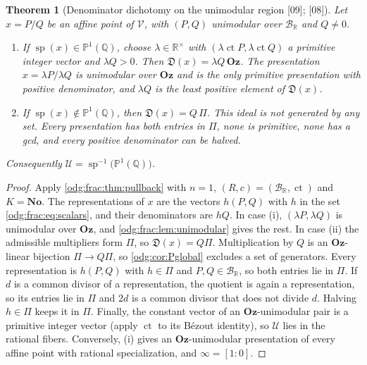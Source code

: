 \documentclass[11pt,oneside]{article}
\numberwithin{equation}{section}
\newtheorem{theorem}{Theorem}[section]
\theoremstyle{definition}
\theoremstyle{remark}
\newcommand{\No}{\mathbf{No}}
\newcommand{\Oz}{\mathbf{Oz}}
\newcommand{\Q}{\mathbb Q}
\newcommand{\R}{\mathbb R}
\newcommand{\BR}{\mathcal B_{\R}}
\newcommand{\ct}{\operatorname{ct}}
\newcommand{\src}[1]{\textup{\textsf{\small[#1]}}}
\newcommand{\Den}{\mathfrak D}
\newcommand{\spz}{\operatorname{sp}}
\newcommand{\Vreg}{\mathcal V}
\newcommand{\Ureg}{\mathcal U}
\begin{document}
\begin{theorem}[Denominator dichotomy on the unimodular region \src{09}; \src{08}]\label{odg:frac:thm:dichotomy}
Let $x=P/Q$ be an affine point of $\Vreg$, with $(P,Q)$ unimodular over $\BR$ and
$Q\ne0$.
\begin{enumerate}[label=\textup{(\roman*)},leftmargin=*]
\item If $\spz(x)\in\mathbb P^1(\Q)$, choose $\lambda\in\R^\times$ with
$(\lambda\ct P,\lambda\ct Q)$ a primitive integer vector and $\lambda Q>0$. Then
$\Den(x)=\lambda Q\,\Oz$. The presentation $x=\lambda P/\lambda Q$ is unimodular
over $\Oz$ and is the only primitive presentation with positive denominator, and
$\lambda Q$ is the least positive element of $\Den(x)$.
\item If $\spz(x)\notin\mathbb P^1(\Q)$, then $\Den(x)=Q\,\Pi$. This ideal is not
generated by any set. Every presentation has both entries in $\Pi$, none is
primitive, none has a gcd, and every positive denominator can be halved.
\end{enumerate}
Consequently $\Ureg=\spz^{-1}\bigl(\mathbb P^1(\Q)\bigr)$.
\end{theorem}
\begin{proof}
Apply \cref{odg:frac:thm:pullback} with $n=1$, $(R,c)=(\BR,\ct)$ and $K=\No$.
The representations of $x$ are the vectors $h(P,Q)$ with $h$ in the set
\eqref{odg:frac:eq:scalars}, and their denominators are $hQ$. In case (i),
$(\lambda P,\lambda Q)$ is unimodular over $\Oz$, and
\cref{odg:frac:lem:unimodular} gives the rest. In case (ii) the admissible
multipliers form $\Pi$, so $\Den(x)=Q\Pi$. Multiplication by $Q$ is an
$\Oz$-linear bijection $\Pi\to Q\Pi$, so \cref{odg:cor:Pglobal} excludes a set
of generators. Every representation is $h(P,Q)$ with $h\in\Pi$ and $P,Q\in\BR$,
so both entries lie in $\Pi$. If $d$ is a common divisor of a representation,
the quotient is again a representation, so its entries lie in $\Pi$ and $2d$ is
a common divisor that does not divide $d$. Halving $h\in\Pi$ keeps it in $\Pi$.
Finally, the constant vector of an $\Oz$-unimodular pair is a primitive integer
vector (apply $\ct$ to its B\'ezout identity), so $\Ureg$ lies in the rational
fibers. Conversely, (i) gives an $\Oz$-unimodular presentation of every affine
point with rational specialization, and $\infty=[1:0]$.
\end{proof}
\end{document}
